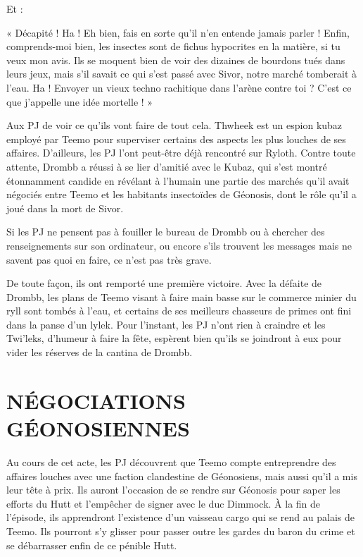 \documentclass[a4paper,10pt,twoside,twocolumn,openany]{book}
\begin{document}
Et :
\begin{quotebox}
« Décapité ! Ha ! Eh bien, fais en sorte qu’il n’en
entende jamais parler ! Enfin, comprends-moi
bien, les insectes sont de fichus hypocrites en la
matière, si tu veux mon avis. Ils se moquent bien
de voir des dizaines de bourdons tués dans leurs
jeux, mais s’il savait ce qui s’est passé avec Sivor,
notre marché tomberait à l’eau. Ha ! Envoyer un
vieux techno rachitique dans l’arène contre toi ?
C’est ce que j’appelle une idée mortelle ! »
\end{quotebox}

Aux PJ de voir ce qu’ils vont faire de tout cela.
Thwheek est un espion kubaz employé par Teemo pour
superviser certains des aspects les plus louches de ses
affaires. D’ailleurs, les PJ l’ont peut-être déjà rencontré sur Ryloth. Contre toute attente, Drombb a réussi
à se lier d’amitié avec le Kubaz, qui s’est montré étonnamment candide en révélant à l’humain une partie des
marchés qu’il avait négociés entre Teemo et les habitants insectoïdes de Géonosis, dont le rôle qu’il a joué
dans la mort de Sivor.

Si les PJ ne pensent pas à fouiller le bureau de Drombb
ou à chercher des renseignements sur son ordinateur, ou
encore s’ils trouvent les messages mais ne savent pas
quoi en faire, ce n’est pas très grave.

De toute façon, ils ont remporté une première victoire.
Avec la défaite de Drombb, les plans de Teemo visant
à faire main basse sur le commerce minier du ryll sont
tombés à l’eau, et certains de ses meilleurs chasseurs de
primes ont fini dans la panse d’un lylek. Pour l’instant, les
PJ n’ont rien à craindre et les Twi’leks, d’humeur à faire
la fête, espèrent bien qu’ils se joindront à eux pour vider
les réserves de la cantina de Drombb.

\chapter{NÉGOCIATIONS
GÉONOSIENNES}
Au cours de cet acte, les PJ découvrent que Teemo
compte entreprendre des affaires louches avec une faction clandestine de Géonosiens, mais aussi qu’il a mis
leur tête à prix. Ils auront l’occasion de se rendre sur
Géonosis pour saper les efforts du Hutt et l’empêcher
de signer avec le duc Dimmock. À la fin de l’épisode, ils
apprendront l’existence d’un vaisseau cargo qui se rend
au palais de Teemo. Ils pourront s’y glisser pour passer
outre les gardes du baron du crime et se débarrasser
enfin de ce pénible Hutt.
\end{document}
